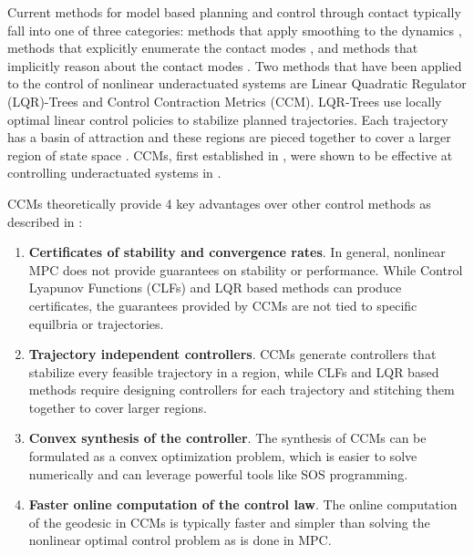 \documentclass[journal]{IEEEtran}
\begin{document}
Current methods for model based planning and control through contact typically fall into one of three categories: methods that apply smoothing to the dynamics \autocite{stewartOptimalControlSystems2010,pangGlobalPlanningContactRich2023}, methods that explicitly enumerate the contact modes \autocite{hoganFeedbackControlPusherSlider2016}, and methods that implicitly reason about the contact modes \autocite{sleimanContactImplicitTrajectoryOptimization2019,nakatsuruImplicitContactRichManipulation2023,posaDirectMethodTrajectory2014}. Two methods that have been applied to the control of nonlinear underactuated systems are Linear Quadratic Regulator (LQR)-Trees and Control Contraction Metrics (CCM). LQR-Trees use locally optimal linear control policies to stabilize planned trajectories. Each trajectory has a basin of attraction and these regions are pieced together to cover a larger region of state space \autocite{tedrakeLQRtreesFeedbackMotion2010}. CCMs, first established in \autocite{manchesterControlContractionMetrics2017}, were shown to be effective at controlling underactuated systems in \autocite{manchesterUnifyingRobotTrajectory2018}.

CCMs theoretically provide 4 key advantages over other control methods as described in \autocite{manchesterControlContractionMetrics2017,manchesterUnifyingRobotTrajectory2018,singhRobustOnlineMotion2017,weiControlContractionMetric2021}:
\begin{enumerate}
	\item {\bf Certificates of stability and convergence rates}. In general, nonlinear MPC does not provide guarantees on stability or performance. While Control Lyapunov Functions (CLFs) and LQR based methods can produce certificates, the guarantees provided by CCMs are not tied to specific equilbria or trajectories.
	\item {\bf Trajectory independent controllers}. CCMs generate controllers that stabilize every feasible trajectory in a region, while CLFs and LQR based methods require designing controllers for each trajectory and stitching them together to cover larger regions.
	\item {\bf Convex synthesis of the controller}. The synthesis of CCMs can be formulated as a convex optimization problem, which is easier to solve numerically and can leverage powerful tools like SOS programming.
	\item {\bf Faster online computation of the control law}. The online computation of the geodesic in CCMs is typically faster and simpler than solving the nonlinear optimal control problem as is done in MPC.
\end{enumerate}
\end{document}
